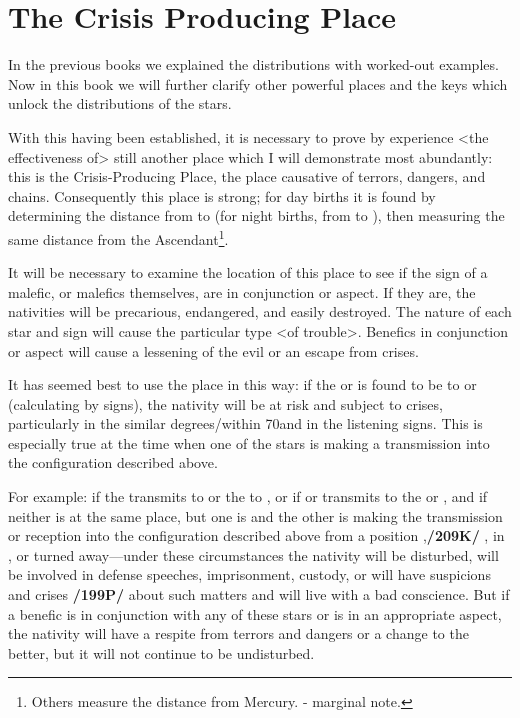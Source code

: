 \section{The Crisis Producing Place}

In the previous books we explained the distributions with worked-out examples. Now in this book we will further clarify other powerful places and the keys which unlock the distributions of the stars.

With this having been established, it is necessary to prove by experience <the effectiveness of> still another place which I will demonstrate most abundantly: this is the Crisis-Producing Place, the place causative of terrors, dangers, and chains. Consequently this place is strong; for day births it is found by determining the distance from \Saturn\xspace to \Mars\xspace (for night births, from \Mars\xspace to \Saturn), then measuring the same distance from the Ascendant\footnote{Others measure the distance from Mercury. - marginal note.}.

It will be necessary to examine the location of this place to see if the
sign of a malefic, or malefics themselves, are in conjunction or aspect. If they are, the nativities will be precarious, endangered, and easily destroyed. The nature of each star and sign will cause the particular type <of trouble>. Benefics in conjunction or aspect will cause a lessening of the evil or an escape from crises.

It has seemed best to use the place in this way: if the \Sun\xspace or \Moon\xspace is found to be \Sextile\xspace to \Saturn\xspace or \Mars\xspace (calculating by signs), the nativity will be at risk and subject to crises, particularly in the similar degrees/within 70\deg and in the listening signs. This is especially true at the time when one of the stars is making a transmission into the configuration described above. 

For example: if the \Sun\xspace transmits to \Saturn\xspace
or the \Moon\xspace to \Mars\xspace, or if \Saturn\xspace or \Mars\xspace transmits to the \Sun\xspace or \Moon\xspace, and if neither is at the same place, but one is \Sextile\xspace and the other is making the transmission or reception into the configuration described
above from a position \Square,\textbf{/209K/} \Trine, in \Opposition, or turned away—under these circumstances the nativity will be disturbed, will be involved in defense speeches, imprisonment, custody, or will have suspicions and crises \textbf{/199P/} about such matters and will live with a bad conscience. But if a benefic is in conjunction with any of these stars or is in an appropriate aspect, the nativity will have a respite from terrors and dangers or a change to the better, but it will not continue to be undisturbed. 

